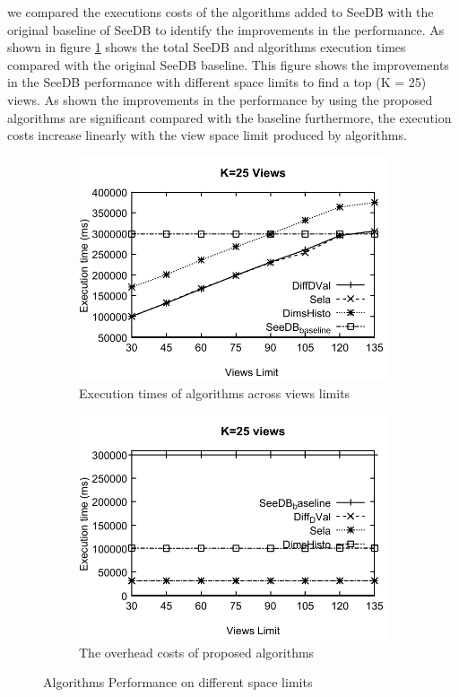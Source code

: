 we compared the executions costs of the algorithms added to SeeDB with the original 
baseline of SeeDB to identify the improvements in the performance. As
shown in figure \ref{fig:fig33} shows the total SeeDB and algorithms execution 
times compared with the original SeeDB baseline. This figure shows the improvements
in the SeeDB performance with different space limits to find a top (K = 25) views. 
As shown the 
improvements in the performance by using the proposed algorithms 
are significant compared with the baseline furthermore, the execution costs increase linearly 
with the view space limit produced by algorithms. 
\begin{figure}
   \centering
  \begin{subfigure}[b]{0.42\textwidth}
    \includegraphics[width=\textwidth]{33.pdf}
    \caption{Execution times of algorithms across views limits}
    \label{fig:fig33}
  \end{subfigure}
  \begin{subfigure}[b]{0.42\textwidth}
    \includegraphics[width=\textwidth]{34.pdf}
    \caption{The overhead costs of proposed algorithms}
    \label{fig:fig34}
  \end{subfigure}
  \caption{Algorithms Performance on different space limits}
\end{figure}

